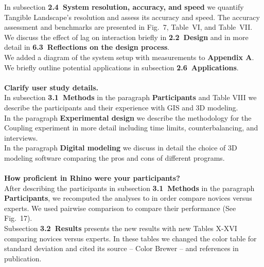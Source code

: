 \documentclass[prodmode,acmtochi]{acmsmall} %
\begin{document}
In subsection \textbf{2.4~System resolution, accuracy, and speed} 
we quantify Tangible Landscape's resolution and
assess its accuracy and speed.
The accuracy assessment and benchmarks are presented 
in Fig.~7, Table~VI, and Table~VII. \\

We discuss the effect of lag on interaction 
briefly in \textbf{2.2~Design} and in more detail in
\textbf{6.3~Reflections on the design process}.\\

We added a diagram of the system setup with measurements to 
\textbf{Appendix A}. \\

We briefly outline potential applications in 
subsection  \textbf{2.6~Applications}. \\

\hrulefill \\

\textbf{Clarify user study details.} \\

In subsection \textbf{3.1~Methods}
in the paragraph \textbf{Participants} and Table VIII
we describe the participants 
and their experience with GIS and 3D modeling. \\

In the paragraph \textbf{Experimental design}
we describe the methodology for the Coupling experiment
in more detail including time limits, counterbalancing, and interviews. \\

In the paragraph \textbf{Digital modeling}
we discuss in detail the choice of 3D modeling software
comparing the pros and cons of different programs. \\

\hrulefill \\

\textbf{How proficient in Rhino were your participants?} \\

After describing the participants in 
subsection \textbf{3.1~Methods}
in the paragraph \textbf{Participants},
we recomputed the analyses
to in order compare novices versus experts.
We used pairwise comparison to compare their performance 
(See Fig.~17). \\

Subsection \textbf{3.2~Results} presents the new results 
with new Tables X-XVI comparing novices versus experts. 
In these tables we changed the color table for standard deviation
and cited its source -- Color Brewer -- and references in publication. \\
\end{document}
